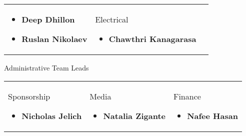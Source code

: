 \documentclass[main.tex]{subfiles}
\begin{document}
\begin{flushleft}
\begin{tabularx}{\linewidth}{@{}XXX@{}}
\begin{itemize}[label={},noitemsep]
    \item \textbf{Deep Dhillon}
    \item \textbf{Ruslan Nikolaev}
    \end{itemize}
    &
    \begin{center}\large{Electrical}\end{center}
    \begin{itemize}[label={},noitemsep]
    \item \textbf{Chawthri Kanagarasa}
    \end{itemize}
\end{tabularx}
\begin{center}\large{Administrative Team Leads}\end{center}
\begin{tabularx}{\linewidth}{@{}XXX@{}}
    \begin{center}\large{Sponsorship}\end{center}
    \begin{itemize}[label={},noitemsep]
    \item \textbf{Nicholas Jelich}
    \end{itemize}
    &
    \begin{center}\large{Media}\end{center}
    \begin{itemize}[label={},noitemsep]
    \item \textbf{Natalia Zigante}
    \end{itemize}
    &
    \begin{center}\large{Finance}\end{center}
    \begin{itemize}[label={},noitemsep]
    \item \textbf{Nafee Hasan}
    \end{itemize}
\end{tabularx}
\end{flushleft}
\end{document}
